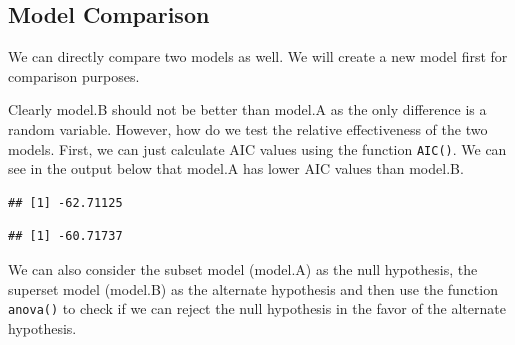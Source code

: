 \documentclass[10pt, letterpaper, twoside]{memoir}\usepackage{knitr}
\begin{document}
\subsection{Model Comparison}

We can directly compare two models as well. We will create a new model first for comparison purposes.

\begin{knitrout}
\color{fgcolor}\begin{kframe}
\begin{alltt}
\hlopt{$} \hlkwb{<-} \hlstd{(}  
 \hlkwb{<-} \hlstd{(} \hlopt{~}  \hlopt{+}   
 \hlkwb{<-} \hlstd{(} \hlopt{~}  \hlopt{+}  \hlopt{+} \hlopt{$}  
\end{alltt}
\end{kframe}
\end{knitrout}

Clearly model.B should not be better than model.A as the only difference is a random variable. However, how do we test the relative effectiveness of the two models. First, we can just calculate AIC values using the function \texttt{AIC()}. We can see in the output below that model.A has lower AIC values than model.B.

\begin{knitrout}
\color{fgcolor}\begin{kframe}
\begin{alltt}
\end{alltt}
\begin{verbatim}
## [1] -62.71125
\end{verbatim}
\begin{alltt}
\end{alltt}
\begin{verbatim}
## [1] -60.71737
\end{verbatim}
\end{kframe}
\end{knitrout}

We can also consider the subset model (model.A) as the null hypothesis, the superset model (model.B) as the alternate hypothesis and then use the function \texttt{anova()} to check if we can reject the null hypothesis in the favor of the alternate hypothesis.
\end{document}
